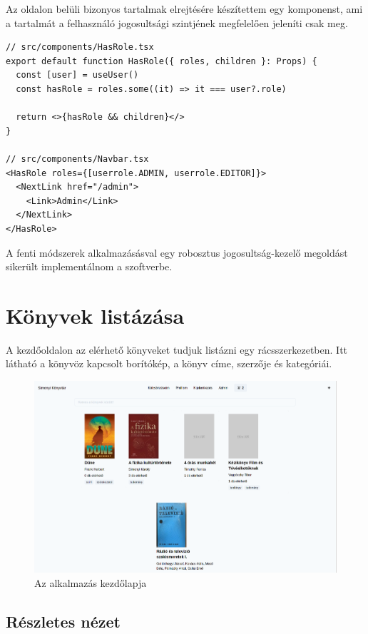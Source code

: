 Az oldalon belüli bizonyos tartalmak elrejtésére készítettem egy komponenst, ami a tartalmát a felhasználó jogosultsági szintjének
megfelelően jeleníti csak meg.

\begin{lstlisting}[caption=Authorizáció komponens és használata]
// src/components/HasRole.tsx
export default function HasRole({ roles, children }: Props) {
  const [user] = useUser()
  const hasRole = roles.some((it) => it === user?.role)

  return <>{hasRole && children}</>
}

// src/components/Navbar.tsx
<HasRole roles={[userrole.ADMIN, userrole.EDITOR]}>
  <NextLink href="/admin">
    <Link>Admin</Link>
  </NextLink>
</HasRole>
\end{lstlisting}

A fenti módszerek alkalmazásásval egy robosztus jogosultság-kezelő megoldást sikerült implementálnom a szoftverbe.

\section{Könyvek listázása}

A kezdőoldalon az elérhető könyveket tudjuk listázni egy rácsszerkezetben.
Itt látható a könyvöz kapcsolt borítókép, a könyv címe, szerzője és kategóriái.

\begin{figure}[!ht]
  \centering
  \includegraphics[width=150mm, keepaspectratio]{figures/index.png}
  \caption{Az alkalmazás kezdőlapja}
  \label{fig:IndexPage}
\end{figure}

\subsection{Részletes nézet}

